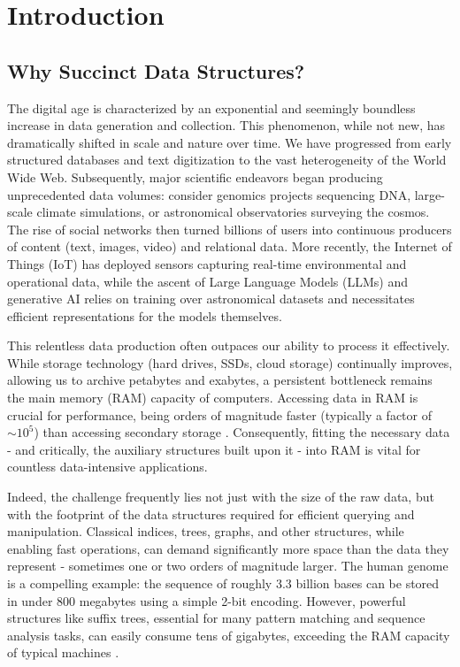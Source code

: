
\chapter{Introduction} %

\label{ch:introduction} %

\section{Why Succinct Data Structures?}
\label{sec:why_succinct}

The digital age is characterized by an exponential and seemingly boundless increase in data generation and collection. This phenomenon, while not new, has dramatically shifted in scale and nature over time. We have progressed from early structured databases and text digitization to the vast heterogeneity of the World Wide Web. Subsequently, major scientific endeavors began producing unprecedented data volumes: consider genomics projects sequencing DNA, large-scale climate simulations, or astronomical observatories surveying the cosmos. The rise of social networks then turned billions of users into continuous producers of content (text, images, video) and relational data. More recently, the Internet of Things (IoT) has deployed sensors capturing real-time environmental and operational data, while the ascent of Large Language Models (LLMs) and generative AI relies on training over astronomical datasets and necessitates efficient representations for the models themselves.

This relentless data production often outpaces our ability to process it effectively. While storage technology (hard drives, SSDs, cloud storage) continually improves, allowing us to archive petabytes and exabytes, a persistent bottleneck remains the main memory (RAM) capacity of computers. Accessing data in RAM is crucial for performance, being orders of magnitude faster (typically a factor of $\sim 10^5$) than accessing secondary storage \cite{navarro2016compact}. Consequently, fitting the necessary data - and critically, the auxiliary structures built upon it - into RAM is vital for countless data-intensive applications.

Indeed, the challenge frequently lies not just with the size of the raw data, but with the footprint of the data structures required for efficient querying and manipulation. Classical indices, trees, graphs, and other structures, while enabling fast operations, can demand significantly more space than the data they represent - sometimes one or two orders of magnitude larger. The human genome is a compelling example: the sequence of roughly 3.3 billion bases can be stored in under 800 megabytes using a simple 2-bit encoding. However, powerful structures like suffix trees, essential for many pattern matching and sequence analysis tasks, can easily consume tens of gigabytes, exceeding the RAM capacity of typical machines \cite{navarro2016compact}.

